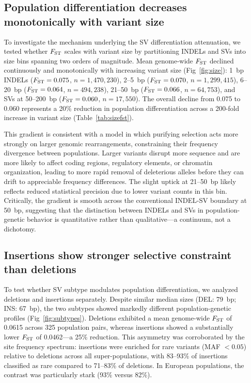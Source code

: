 \subsection*{Population differentiation decreases monotonically with variant size}

To investigate the mechanism underlying the SV differentiation attenuation, we tested whether $F_\mathrm{ST}$ scales with variant size by partitioning INDELs and SVs into size bins spanning two orders of magnitude. Mean genome-wide $F_\mathrm{ST}$ declined continuously and monotonically with increasing variant size (Fig~\ref{fig:size}): 1~bp INDELs ($F_\mathrm{ST} = 0.075$, $n = 1{,}470{,}230$), 2--5~bp ($F_\mathrm{ST} = 0.070$, $n = 1{,}299{,}415$), 6--20~bp ($F_\mathrm{ST} = 0.064$, $n = 494{,}238$), 21--50~bp ($F_\mathrm{ST} = 0.066$, $n = 64{,}753$), and SVs at 50--200~bp ($F_\mathrm{ST} = 0.060$, $n = 17{,}550$). The overall decline from 0.075 to 0.060 represents a 20\% reduction in population differentiation across a 200-fold increase in variant size (Table~\ref{tab:sizefst}).

This gradient is consistent with a model in which purifying selection acts more strongly on larger genomic rearrangements, constraining their frequency divergence between populations. Larger variants disrupt more sequence and are more likely to affect coding regions, regulatory elements, or chromatin organization, leading to more rapid removal of deleterious alleles before they can drift to appreciable frequency differences. The slight uptick at 21--50~bp likely reflects reduced statistical precision due to lower variant counts in this bin. Critically, the gradient is smooth across the conventional INDEL-SV boundary at 50~bp, suggesting that the distinction between INDELs and SVs in population-genetic behavior is quantitative rather than qualitative---a continuum, not a dichotomy.

\subsection*{Insertions show stronger selective constraint than deletions}

To test whether SV subtype modulates population differentiation, we analyzed deletions and insertions separately. Despite similar median sizes (DEL: 79~bp; INS: 67~bp), the two subtypes showed markedly different population-genetic profiles (Fig~\ref{fig:subtypes}). Deletions exhibited a mean genome-wide $F_\mathrm{ST}$ of 0.0615 across 325 population pairs, whereas insertions showed a substantially lower $F_\mathrm{ST}$ of 0.0462---a 25\% reduction. This asymmetry was corroborated by the site frequency spectrum: insertions were enriched for rare variants (MAF $< 0.05$) relative to deletions across all super-populations, with 83--93\% of insertions classified as rare compared to 71--83\% of deletions. In European populations, the contrast was particularly stark (93\% versus 82\%).

